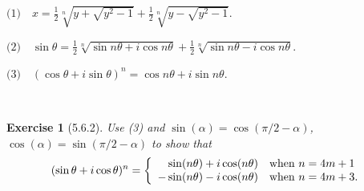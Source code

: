 \documentclass[12pt]{article}
\newcommand{\XB}{\color{black}}
\newcommand{\XBB}{\color{blue}}
\newcommand{\ds}{\displaystyle}
\theoremstyle{plain}
\newtheorem{ex}{Exercise}
\begin{document}
\newpage


$ \textit{(1)} \quad \ds x = \frac{1}{2} \sqrt[n]{ \ds y + \sqrt{ y^{2} - 1 } } + \frac{1}{2} \sqrt[n]{ \ds y - \sqrt{ y^{2} - 1 } } $.

$ \textit{(2)} \quad \ds \sin{\theta} = \frac{1}{2} \sqrt[n]{ \sin{n\theta} + i\cos{n\theta} } + \frac{1}{2} \sqrt[n]{ \sin{n\theta} - i\cos{n\theta} } $.

$ \textit{(3)} \quad \ds ( \cos{\theta} + i\sin{\theta} )^{n} = \cos{n\theta} + i\sin{n\theta} $.

\XBB\hrulefill\XB \\
\begin{ex} [5.6.2]
  Use (3) and $ \sin(\alpha) = \cos(\pi/2 - \alpha) $, $ \cos(\alpha )= \sin(\pi/2 - \alpha) $ to show that
  \[
    (\sin\theta + i\cos\theta)^{n} = 
    \left\{ \begin{array}{rl}
       \sin(n\theta) + i\cos(n\theta) & \mbox{when $ n = 4m + 1 $} \\
      -\sin(n\theta) - i\cos(n\theta) & \mbox{when $ n = 4m + 3 $.}
    \end{array} \right.
  \]
\end{ex}
\XBB\hrulefill\XB \\
\end{document}
